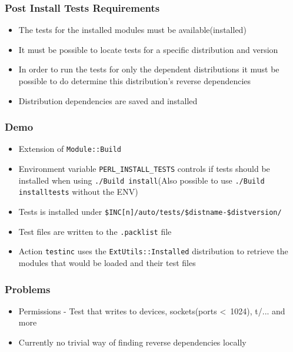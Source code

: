 \documentclass[10pt]{beamer}
\begin{document}
\begin{frame}
\frametitle{Post Install Tests Requirements}
\begin{itemize}
\item The tests for the installed modules must be available(installed)
\item It must be possible to locate tests for a specific distribution and version
\item In order to run the tests for only the dependent distributions it must be possible to do determine this distribution's reverse dependencies
\item Distribution dependencies are saved and installed
\end{itemize}
\end{frame}

\begin{frame}[fragile]
\frametitle{Demo}

\begin{itemize}
\item Extension of \verb|Module::Build|
\item Environment variable \verb|PERL_INSTALL_TESTS| controls if tests should be installed when using  \verb|./Build install|(Also possible to use \verb|./Build installtests| without the ENV)
\item Tests is installed under \verb|$INC[n]/auto/tests/$distname-$distversion/|
\item Test files are written to the \verb|.packlist| file
\item Action \verb|testinc| uses the \verb|ExtUtils::Installed| distribution to retrieve the modules that would be loaded and their test files
\end{itemize}
\end{frame}

\begin{frame}[fragile]
\frametitle{Problems}
\begin{itemize}
\item Permissions - Test that writes to devices, sockets(ports \textless \ 1024), t/... and more
\item Currently no trivial way of finding reverse dependencies locally
\end{itemize}
\end{frame}
\end{document}
